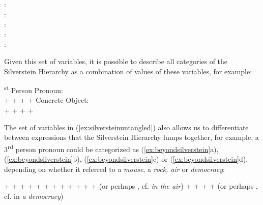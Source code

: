 \begin{exe}
\ex
\begin{xlist} 
\label{ex:silversteinuntangled}
\ex {}:\\
\ex {}:\\
\ex {}:\\
\ex {}:\\
\ex {}:\\
\end{xlist}
\end{exe}

Given this set of variables, it is possible to describe all categories of the Silverstein Hierarchy as a combination of values of these variables, for example:

\begin{exe}
\ex
\begin{xlist} 
\label{ex:silversteincomb}
\textsuperscript{st} Person Pronoun:\\
 +  +  +  + 
\ex Concrete Object:\\
 +  +  +  + 
\end{xlist}
\end{exe}

The set of variables in (\ref{ex:silversteinuntangled}) also allows us to differentiate between expressions that the Silverstein Hierarchy lumps together, for example, a 3\textsuperscript{rd} person pronoun could be categorized as (\ref{ex:beyondsilverstein}a), (\ref{ex:beyondsilverstein}b), (\ref{ex:beyondsilverstein}c) or (\ref{ex:beyondsilverstein}d), depending on whether it referred to a \textit{mouse}, a \textit{rock, air} or \textit{democracy}:

\begin{exe}
\ex
\begin{xlist} 
\label{ex:beyondsilverstein}
\ex {} +  +  +  + 
\ex {} +  +  +  + 
\ex {} +  +  +  +  (or perhaps , cf. \textit{in the air})
\ex {} +  +  +  +  (or perhaps , cf. in \textit{a democracy})
\end{xlist}
\end{exe}

